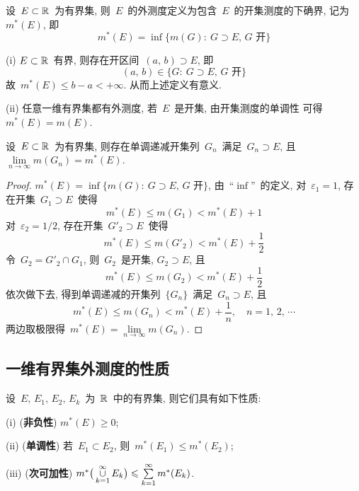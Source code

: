 \begin{definition}
设~$E \subset \mathbb{R}$~为有界集, 则~$E$~的外测度定义为包含~$E$~的开集测度的下确界,
记为~$m^*(E)$, 即
\[
m^*(E) = \inf\big\{m(G): \: G \supset E,\, G \mbox{~开}\big\}
\]
\end{definition}

\begin{remark} \label{rem231}
(i) $E \subset \mathbb{R}$~有界, 则存在开区间~$(a,\,b) \supset E$,
即
\[
(a,\,b) \in \{G: \: G \supset E,\, G \mbox{~开}\}
\]
故~$m^*(E) \leqslant b - a < +\infty$. 从而上述定义有意义.

(ii) 任意一维有界集都有外测度, 若~$E$~是开集, 由开集测度的单调性
可得~$m^*(E) = m(E)$.
\end{remark}

\begin{theorem} \label{thm231}
设~$E \subset \mathbb{R}$~为有界集, 则存在单调递减开集列~$G_n$~满足~$G_n \supset E$,
且~$\lim\limits_{n \to \infty} m(G_n) = m^*(E)$.
\end{theorem}

\begin{proof}
$m^*(E) = \inf\{m(G): \: G \supset E,\, G \mbox{~开}\}$, 由~``$\inf$''~的定义,
对~$\varepsilon_1 = 1$, 存在开集~$G_1 \supset E$~使得
\[
m^*(E) \leqslant m(G_1) < m^*(E) + 1
\]
对~$\varepsilon_2 = 1/2$, 存在开集~$G'_2 \supset E$~使得
\[
m^*(E) \leqslant m(G'_2) < m^*(E) + \frac{1}{2}
\]
令~$G_2 = G'_2 \cap G_1$, 则~$G_2$~是开集, $G_2 \supset E$, 且
\[
m^*(E) \leqslant m(G_2) < m^*(E) + \frac{1}{2}
\]
依次做下去, 得到单调递减的开集列~$\{G_n\}$~满足~$G_n \supset E$, 且
\[
m^*(E) \leqslant m(G_n) < m^*(E) + \frac{1}{n}, \quad n = 1,\,2,\,\cdots
\]
两边取极限得~$m^*(E) = \lim\limits_{n \to \infty} m(G_n)$.
\end{proof}

\subsection{一维有界集外测度的性质}

\begin{proposition}[外测度性质]
设~$E,\,E_1,\,E_2,\,E_k$~为~$\mathbb{R}$~中的有界集, 则它们具有如下性质:

(i) (\textbf{非负性}) $m^*(E) \geqslant 0$;

(ii) (\textbf{单调性}) 若~$E_1 \subset E_2$, 则~$m^*(E_1) \leqslant m^*(E_2)$;

(iii) (\textbf{次可加性}) $m^*\big( \mathop{\cup}\limits_{k=1}^\infty E_k \big) \leqslant \sum\limits_{k=1}^\infty m^*(E_k)$.
\end{proposition}


